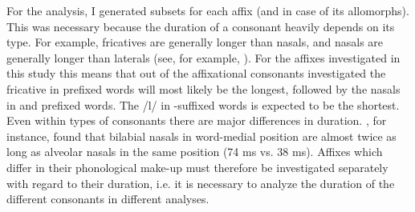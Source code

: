 For the analysis, I generated subsets for each affix (and in case of  its allomorphs). This was necessary because the duration of a consonant heavily depends on its type. For example, fricatives are generally longer than nasals, and nasals are generally longer than laterals (see, for example,  \citealt{Umeda.1977}). For the affixes investigated in this study this means that out of the affixational consonants investigated the fricative in prefixed words will most likely be the longest, followed by the nasals in  and  prefixed words. The /l/ in -suffixed words is expected to be the shortest. Even within types of consonants there are major differences 
in duration. \cite{Umeda.1977}, for instance, found that bilabial nasals in word-medial position are almost twice as long as alveolar nasals in the same position (74 ms vs. 38 ms). 
Affixes which differ in their phonological make-up must therefore be investigated separately with regard to their duration, i.e. it is necessary to analyze the duration of the different consonants in different analyses. %




